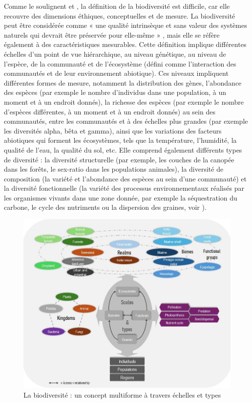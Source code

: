 \begin{displayquote}
\begin{displayquote}
\begin{displayquote}
{Comme le soulignent \cite{VanDyke2008} et \cite{mouysset_diversity_2023}, la définition de la biodiversité est difficile, car elle recouvre des dimensions éthiques, conceptuelles et de mesure. La biodiversité peut être considérée comme « une qualité intrinsèque et sans valeur des systèmes naturels qui devrait être préservée pour elle-même » \citep{VanDyke2008, mouysset_diversity_2023}, mais elle se réfère également à des caractéristiques mesurables.
%
Cette définition implique différentes échelles d'un point de vue hiérarchique, au niveau génétique, au niveau de l'espèce, de la communauté et de l'écosystème (défini comme l'interaction des communautés et de leur environnement abiotique). Ces niveaux impliquent différentes formes de mesure, notamment la distribution des gènes, l'abondance des espèces (par exemple le nombre d'individus dans une population, à un moment et à un endroit donnés), la richesse des espèces (par exemple le nombre d'espèces différentes, à un moment et à un endroit donnés) au sein des communautés, entre les communautés et à des échelles plus grandes (par exemple les diversités alpha, bêta et gamma), ainsi que les variations des facteurs abiotiques qui forment les écosystèmes, tels que la température, l'humidité, la qualité de l'eau, la qualité du sol, etc. 
Elle comprend également différents types de diversité : la diversité structurelle (par exemple, les couches de la canopée dans les forêts, le sex-ratio dans les populations animales), la diversité de composition (la variété et l'abondance des espèces au sein d'une communauté) et la diversité fonctionnelle (la variété des processus environnementaux réalisés par les organismes vivants dans une zone donnée, par exemple la séquestration du carbone, le cycle des nutriments ou la dispersion des graines, voir \cite{loreau_biodiversity_2002}).

\begin{figure}
	\centering
	\includegraphics[width =.8\textwidth]{figures/intro/biodiv_illustration.jpg}
	\caption{ La biodiversité : un concept multiforme à travers échelles et types}
	\label{fig:intro_biod}
\end{figure}

}
\end{displayquote}
\end{displayquote}
\end{displayquote}

